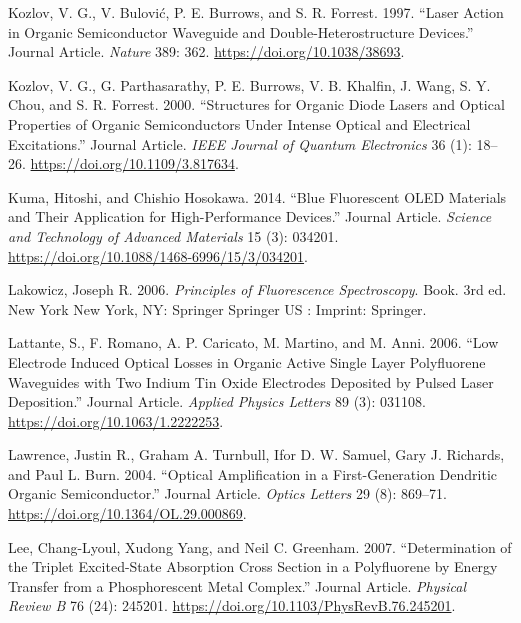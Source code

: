 \documentclass[
  letterpaper,
  DIV=11,
  numbers=noendperiod,
  oneside]{scrreprt}
\newlength{\cslhangindent}
\newlength{\cslentryspacingunit} %
\newenvironment{CSLReferences}[2] %
 {%
  \setlength{\parindent}{0pt}
  \ifodd #1
  \let\oldpar\par
  \def\par{\hangindent=\cslhangindent\oldpar}
  \fi
  \setlength{\parskip}{#2\cslentryspacingunit}
 }%
 {}
\begin{document}
\begin{CSLReferences}{1}{0}
\leavevmode{}%
Kozlov, V. G., V. Bulović, P. E. Burrows, and S. R. Forrest. 1997.
{``Laser Action in Organic Semiconductor Waveguide and
Double-Heterostructure Devices.''} Journal Article. \emph{Nature} 389:
362. \url{https://doi.org/10.1038/38693}.

\leavevmode{}%
Kozlov, V. G., G. Parthasarathy, P. E. Burrows, V. B. Khalfin, J. Wang,
S. Y. Chou, and S. R. Forrest. 2000. {``Structures for Organic Diode
Lasers and Optical Properties of Organic Semiconductors Under Intense
Optical and Electrical Excitations.''} Journal Article. \emph{IEEE
Journal of Quantum Electronics} 36 (1): 18--26.
\url{https://doi.org/10.1109/3.817634}.

\leavevmode{}%
Kuma, Hitoshi, and Chishio Hosokawa. 2014. {``Blue Fluorescent OLED
Materials and Their Application for High-Performance Devices.''} Journal
Article. \emph{Science and Technology of Advanced Materials} 15 (3):
034201. \url{https://doi.org/10.1088/1468-6996/15/3/034201}.

\leavevmode{}%
Lakowicz, Joseph R. 2006. \emph{Principles of Fluorescence
Spectroscopy}. Book. 3rd ed. New York New York, NY: Springer Springer US
: Imprint: Springer.

\leavevmode{}%
Lattante, S., F. Romano, A. P. Caricato, M. Martino, and M. Anni. 2006.
{``Low Electrode Induced Optical Losses in Organic Active Single Layer
Polyfluorene Waveguides with Two Indium Tin Oxide Electrodes Deposited
by Pulsed Laser Deposition.''} Journal Article. \emph{Applied Physics
Letters} 89 (3): 031108. \url{https://doi.org/10.1063/1.2222253}.

\leavevmode{}%
Lawrence, Justin R., Graham A. Turnbull, Ifor D. W. Samuel, Gary J.
Richards, and Paul L. Burn. 2004. {``Optical Amplification in a
First-Generation Dendritic Organic Semiconductor.''} Journal Article.
\emph{Optics Letters} 29 (8): 869--71.
\url{https://doi.org/10.1364/OL.29.000869}.

\leavevmode{}%
Lee, Chang-Lyoul, Xudong Yang, and Neil C. Greenham. 2007.
{``Determination of the Triplet Excited-State Absorption Cross Section
in a Polyfluorene by Energy Transfer from a Phosphorescent Metal
Complex.''} Journal Article. \emph{Physical Review B} 76 (24): 245201.
\url{https://doi.org/10.1103/PhysRevB.76.245201}.


\end{CSLReferences}
\end{document}

